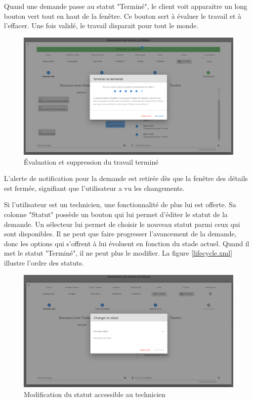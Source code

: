 \documentclass[
    iai, %
    eai, %
]{heig-tb}
\begin{document}
Quand une demande passe au statut "Terminé", le client voit apparaitre un long bouton vert tout en haut de la fenêtre. Ce bouton sert à évaluer le travail et à l'effacer. Une fois validé, le travail disparait pour tout le monde.

\begin{figure}[h]
  \includegraphics[width=14cm]{ui_jobinfo_client3.PNG}
  \caption{Évaluation et suppression du travail terminé}
\end{figure}

L'alerte de notification pour la demande est retirée dès que la fenêtre des détails est fermée, signifiant que l'utilisateur a vu les changements.

\newpage
Si l'utilisateur est un technicien, une fonctionnalité de plus lui est offerte. Sa colonne "Statut" possède un bouton qui lui permet d'éditer le statut de la demande. Un sélecteur lui permet de choisir le nouveau statut parmi ceux qui sont disponibles. Il ne peut que faire progresser l'avancement de la demande, donc les options qui s'offrent à lui évoluent en fonction du stade actuel. Quand il met le statut "Terminé", il ne peut plus le modifier. La figure \ref{lifecycle.xml} illustre l'ordre des statuts.

\begin{figure}[h]
  \includegraphics[width=14cm]{ui_jobinfo_tech2.PNG}
  \caption{Modification du statut accessible au technicien}
\end{figure}
\end{document}
